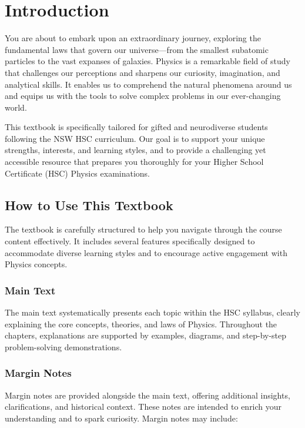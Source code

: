 \chapter{Introduction}

 You are about to embark upon an extraordinary journey, exploring the fundamental laws that govern our universe—from the smallest subatomic particles to the vast expanses of galaxies. Physics is a remarkable field of study that challenges our perceptions and sharpens our curiosity, imagination, and analytical skills. It enables us to comprehend the natural phenomena around us and equips us with the tools to solve complex problems in our ever-changing world.

This textbook is specifically tailored for gifted and neurodiverse students following the NSW HSC curriculum. Our goal is to support your unique strengths, interests, and learning styles, and to provide a challenging yet accessible resource that prepares you thoroughly for your Higher School Certificate (HSC) Physics examinations.

\section{How to Use This Textbook}
\FloatBarrier

The textbook is carefully structured to help you navigate through the course content effectively. It includes several features specifically designed to accommodate diverse learning styles and to encourage active engagement with Physics concepts.

\subsection{Main Text}
\FloatBarrier

The main text systematically presents each topic within the HSC syllabus, clearly explaining the core concepts, theories, and laws of Physics. Throughout the chapters, explanations are supported by examples, diagrams, and step-by-step problem-solving demonstrations.

\subsection{Margin Notes}
\FloatBarrier

Margin notes are provided alongside the main text, offering additional insights, clarifications, and historical context. These notes are intended to enrich your understanding and to spark curiosity. Margin notes may include:

